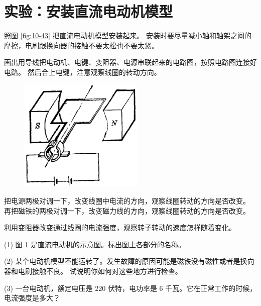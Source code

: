 \section{实验：安装直流电动机模型}\label{sec:10-11}

照图 \ref{fig:10-43} 把直流电动机模型安装起来。
安装时要尽量减小轴和轴架之间的摩擦，电刷跟换向器的接触不要太松也不要太紧。

画出用导线把电动机、电键、变阻器、电源串联起来的电路图，按照电路图连接好电路。
然后合上电键，注意观察线圈的转动方向。

\begin{figure}
    \centering
    \includegraphics[width=6cm]{../pic/czwl2-ch10-44}
    \caption{}\label{fig:10-44}
\end{figure}

把电源两极对调一下，改变线圈中电流的方向，观察线圈转动的方向是否改变。
再把磁铁的两极对调一下，改变磁力线的方向，观察线圈转动的方向是否改变。

利用变阻器改变通过线圈的电流强度，观察转子转动的速度怎样随着变化。


\lianxi

(1) 图 \ref{fig:10-44} 是直流电动机的示意图。标出图上各部分的名称。

(2) 某个电动机模型不能运转了。发生故障的原因可能是磁铁没有磁性或者是换向器和电刷接触不良。
试说明你如何对这些地方进行检查。

(3) 一台电动机，额定电压是 220 伏特，电功率是 6 千瓦。它在正常工作的时候，电流强度是多大？

